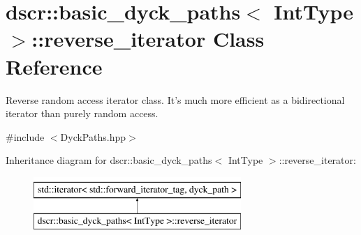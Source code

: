 \hypertarget{classdscr_1_1basic__dyck__paths_1_1reverse__iterator}{\section{dscr\-:\-:basic\-\_\-dyck\-\_\-paths$<$ Int\-Type $>$\-:\-:reverse\-\_\-iterator Class Reference}
\label{classdscr_1_1basic__dyck__paths_1_1reverse__iterator}
}


Reverse random access iterator class. It's much more efficient as a bidirectional iterator than purely random access.  




{\ttfamily \#include $<$Dyck\-Paths.\-hpp$>$}

Inheritance diagram for dscr\-:\-:basic\-\_\-dyck\-\_\-paths$<$ Int\-Type $>$\-:\-:reverse\-\_\-iterator\-:\begin{figure}[H]
\begin{center}
\leavevmode
\includegraphics[height=2.000000cm]{classdscr_1_1basic__dyck__paths_1_1reverse__iterator}
\end{center}
\end{figure}
